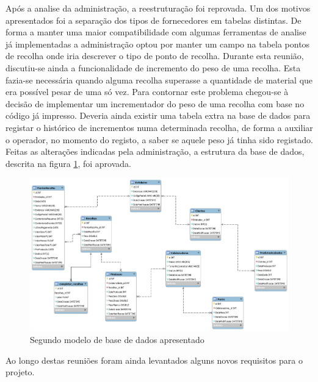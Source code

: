 Após a analise da administração, a reestruturação foi reprovada. Um dos motivos apresentados foi a separação dos tipos de fornecedores em tabelas distintas. De forma a manter uma maior compatibilidade com algumas ferramentas de analise já implementadas a administração optou por manter um campo na tabela pontos de recolha onde iria descrever o tipo de ponto de recolha. Durante esta reunião, discutiu-se ainda a funcionalidade de incremento do peso de uma recolha. Esta fazia-se necessária quando alguma recolha superasse a quantidade de material que era possível pesar de uma só vez. Para contornar este problema chegou-se à decisão de implementar um incrementador do peso de uma recolha com base no código já impresso.  Deveria ainda existir uma tabela extra na base de dados para registar o histórico de incrementos numa determinada recolha, de forma a auxiliar o operador, no momento do registo, a saber se aquele peso já tinha sido registado. Feitas as alterações indicadas pela administração, a estrutura da base de dados, descrita na figura \ref{fig:fig:db_model new}, foi aprovada.
\newpage
\begin{figure}[H] 
    \begin{center}
    \includegraphics[width=\textwidth,keepaspectratio]{figuras/DB_Model/new.png}
    \caption{Segundo modelo de base de dados apresentado}\label{fig:fig:db_model new} 
    \end{center}
\end{figure}

Ao longo destas reuniões foram ainda levantados alguns novos requisitos para o projeto.
\newpage

